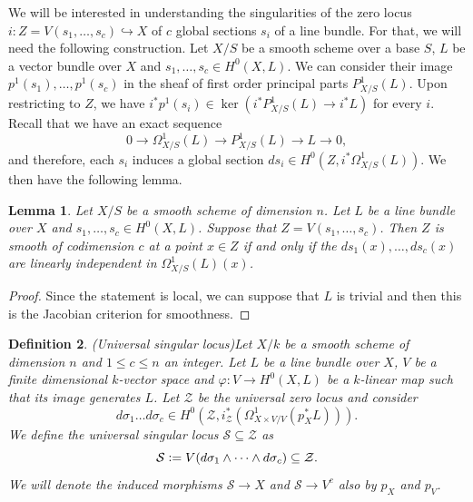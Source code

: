 \documentclass[a4paper,12pt]{amsart}
\newtheorem{definition}{Definition}[section]
\newtheorem{lemma}[definition]{Lemma}
\numberwithin{equation}{section}
\newcommand{\defeq}{\vcentcolon=}
\renewcommand{\leq}{\leqslant}
\renewcommand{\_}{\rule{0.25cm}{0.4pt}}
\begin{document}
We will be interested in understanding the singularities of the zero locus $i\colon Z=V(s_{1},\dots, s_{c})\hookrightarrow X$ of $c$ global sections $s_{i}$ of a line bundle. For that, we will need the following construction. Let $X/S$ be a smooth scheme over a base $S$, $L$ be a vector bundle over $X$ and $s_{1},\dots, s_{c}\in H^{0}(X,L)$. We can consider their image $p^{1}(s_{1}),\dots, p^{1}(s_{c})$ in the sheaf of first order principal parts $P_{X/S}^{1}(L)$. Upon restricting to $Z$, we have $i^{\ast}p^{1}(s_{i})\in \ker(i^{\ast}P^{1}_{X/S}(L)\to i^{\ast}L)$ for every $i$. Recall that we have an exact sequence
\[
0\to \Omega^{1}_{X/S}(L)\to P^{1}_{X/S}(L)\to L\to 0,
\]
and therefore, each $s_{i}$ induces a global section $ds_{i}\in H^{0}(Z, i^{\ast}\Omega^{1}_{X/S}(L))$. We then have the following lemma.

\begin{lemma}\label{bad locus characterization}
    Let $X/S$ be a smooth scheme of dimension $n$. Let $L$ be a line bundle over $X$ and $s_{1},\dots, s_{c}\in H^{0}(X,L)$. Suppose that $Z=V(s_{1},\dots, s_{c})$. Then $Z$ is smooth of codimension $c$ at a point $x\in Z$ if and only if the $ds_{1}(x),\dots, ds_{c}(x)$ are linearly independent in $\Omega^{1}_{X/S}(L)(x)$.
\end{lemma}
\begin{proof}
    Since the statement is local, we can suppose that $L$ is trivial and then this is the Jacobian criterion for smoothness.
\end{proof}

\begin{definition}{(Universal singular locus)}\label{singular locus def}
    Let $X/k$ be a smooth scheme of dimension $n$ and $1\leq c\leq n$ an integer. Let $L$ be a line bundle over $X$, $V$ be a finite dimensional $k$-vector space and $\varphi\colon V\to H^{0}(X,L)$ be a $k$-linear map such that its image generates $L$. Let $\mathcal{Z}$ be the universal zero locus and consider
    \[
    d\sigma_{1}\dots d\sigma_{c}\in H^{0}(\mathcal{Z},i_{\mathcal{Z}}^{\ast}(\Omega^{1}_{X\times V/V}(p_{X}^{\ast}L))).
    \]
    We define the universal singular locus $\mathcal{S}\subseteq \mathcal{Z}$ as
    \[
    \mathcal{S}\defeq V(d\sigma_{1}\wedge\cdots\wedge d\sigma_{c})\subseteq \mathcal{Z}.
    \]
    We will denote the induced morphisms $\mathcal{S}\to X$ and $\mathcal{S}\to V^{c}$ also by $p_{X}$ and $p_{V}$.
\end{definition}
\end{document}
